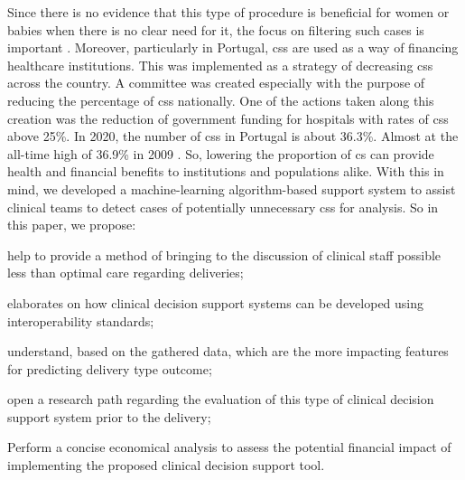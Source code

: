 Since there is no evidence that this type of procedure is beneficial for women or babies when there is no clear need for it, the focus on filtering such cases is important \cite{chenNonClinicalInterventions2018}.
Moreover, particularly in Portugal, \acp{cs} are used as a way of financing healthcare institutions. This was implemented as a strategy of decreasing \ac{cs}s across the country. A committee was created especially with the purpose of reducing the percentage of \acp{cs} nationally. One of the actions taken along this creation was the reduction of government funding for hospitals with rates of \acp{cs} above 25\%.
In 2020, the number of \acp{cs} in Portugal is about 36.3\%. Almost at the all-time high of 36.9\% in 2009 \cite{pordatacesarianas}.
So, lowering the proportion of \ac{cs} can provide health and financial benefits to institutions and populations alike. With this in mind, we developed a  machine-learning algorithm-based support system to assist clinical teams to detect cases of potentially unnecessary \acp{cs} for analysis. So in this paper, we propose:
\begin{myitemize}
    \item help to provide a method of bringing to the discussion of clinical staff possible less than optimal care regarding deliveries;
    \item elaborates on how clinical decision support systems can be developed using interoperability standards;
    \item understand, based on the gathered data, which are the more impacting features for predicting delivery type outcome;
    \item open a research path regarding the evaluation of this type of clinical decision support system prior to the delivery;
    \item Perform a concise economical analysis to assess the potential financial impact of implementing the proposed clinical decision support tool.

\end{myitemize}